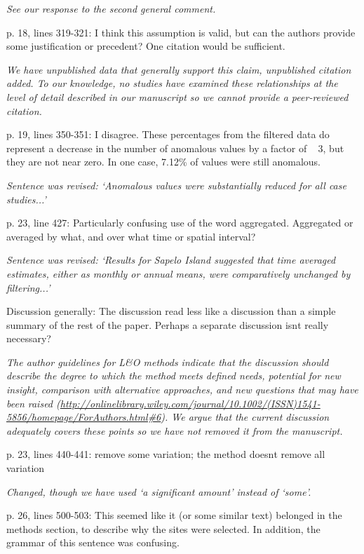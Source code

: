 \documentclass[letterpaper,12pt]{article}\usepackage[]{graphicx}\usepackage[]{color}
\begin{document}
{\it See our response to the second general comment.}

p. 18, lines 319-321: I think this assumption is valid, but can the authors provide some justification or precedent? One citation would be sufficient.

{\it We have unpublished data that generally support this claim, unpublished citation added.  To our knowledge, no studies have examined these relationships at the level of detail described in our manuscript so we cannot provide a peer-reviewed citation.}

p. 19, lines 350-351: I disagree. These percentages from the filtered data do represent a decrease
in the number of anomalous values by a factor of ~ 3, but they are not near zero. In one case,
7.12\% of values were still anomalous.

{\it Sentence was revised: `Anomalous values were substantially reduced for all case studies...'}

p. 23, line 427: Particularly confusing use of the word aggregated. Aggregated or averaged by
what, and over what time or spatial interval?

{\it Sentence was revised: `Results for Sapelo Island suggested that time averaged estimates, either as monthly or annual means, were comparatively unchanged by filtering...'}

Discussion generally: The discussion read less like a discussion than a simple summary of the rest of the paper. Perhaps a separate discussion isnt really necessary?

{\it The author guidelines for L\&O methods indicate that the discussion should describe the degree to which the method meets defined needs, potential for new insight, comparison with alternative approaches, and new questions that may have been raised (\href{http://onlinelibrary.wiley.com/journal/10.1002/(ISSN)1541-5856/homepage/ForAuthors.html#6}{http://onlinelibrary.wiley.com/journal/10.1002/(ISSN)1541-5856/homepage/ForAuthors.html\#6}).  We argue that the current discussion adequately covers these points so we have not removed it from the manuscript. 
}

p. 23, lines 440-441: remove some variation; the method doesnt remove all variation

{\it Changed, though we have used `a significant amount' instead of `some'.}

p. 26, lines 500-503: This seemed like it (or some similar text) belonged in the methods section, to describe why the sites were selected. In addition, the grammar of this sentence was confusing.
\end{document}
